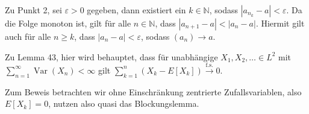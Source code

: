 \documentclass{article}
\begin{document}
Zu Punkt 2, sei $\varepsilon>0$ gegeben, dann existiert ein $k\in\mathbb{N}$, sodass $|a_{n_k}-a|<\varepsilon$.
Da die Folge monoton ist, gilt für alle $n\in\mathbb{N}$, dass $|a_{n+1}-a|<|a_{n}-a|$.
Hiermit gilt auch für alle $n\geq k$, dass $|a_n-a|<\varepsilon$, sodass $(a_n)\to a$.

Zu Lemma 43, hier wird behauptet, dass für unabhängige $X_1,X_2,\dots\in L^2$ mit  $\sum_{n=1}^\infty\operatorname{Var}(X_n)<\infty$ gilt $\sum_{k=1}^n(X_k-E[X_k])\xrightarrow{\text{f.s.}}0$.

Zum Beweis betrachten wir ohne Einschränkung zentrierte Zufallsvariablen, also $E[X_k]=0$, nutzen also quasi das Blockungslemma.
\newpage



\end{document}
